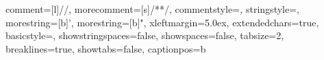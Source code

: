 {    %
	comment=[l]{//},
	morecomment=[s]{/*}{*/},
    commentstyle=\color{CadetBlue}\textit,
	stringstyle=\color{ForestGreen},
	morestring=[b]',
	morestring=[b]",
    xleftmargin=5.0ex,
    extendedchars=true,
	basicstyle=\small\ttfamily,
	showstringspaces=false,
	showspaces=false,
	tabsize=2,
	breaklines=true,
	showtabs=false,
	captionpos=b
}

